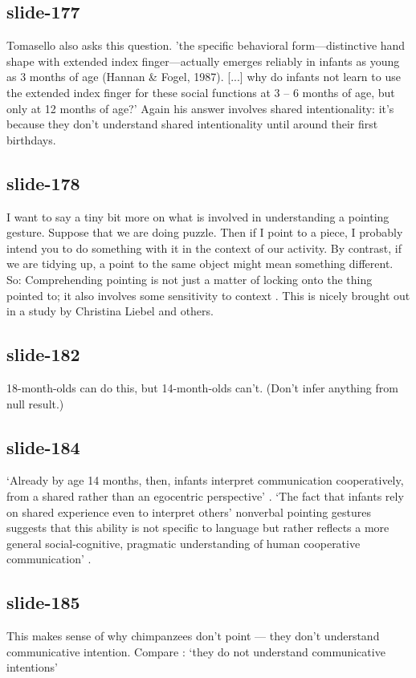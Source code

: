 \documentclass[12pt,\papersize]{extarticle}
\begin{document}
 
\subsection{slide-177}
Tomasello also asks this question.
'the specific behavioral form---distinctive hand shape with extended index finger---actually emerges reliably in infants as young as 3 months of age (Hannan \& Fogel, 1987). [...] why do infants not learn to use the extended index finger for these social functions at 3 – 6 months of age, but only at 12 months of age?' \citep[p.\ 716]{Tomasello:2007fi}
Again his answer involves shared intentionality: it's because they don't understand shared intentionality until around their first birthdays.
 
 
\subsection{slide-178}
I want to say a tiny bit more on what is involved in understanding a pointing gesture.
Suppose that we are doing puzzle. Then if I point to a piece, I probably intend you to do something with it in the context of our activity.
By contrast, if we are tidying up, a point to the same object might mean something different.
So:
Comprehending pointing is not just a matter of locking onto the thing pointed to; it also involves some sensitivity to context \citep[see][]{Liebal:2010lr}.
This is nicely brought out in a study by Christina Liebel and others.
 
 
\subsection{slide-182}
18-month-olds can do this, but 14-month-olds can't. (Don't infer anything from null result.)
 
 
\subsection{slide-184}
‘Already by age 14 months, then, infants interpret communication cooperatively, from a shared rather than an egocentric perspective’ \citep[p.\ 269]{Liebal:2010lr}.
‘The fact that infants rely on shared experience even to interpret others’ nonverbal pointing gestures suggests that this ability is not specific to language but rather reflects a more general social-cognitive, pragmatic understanding of human cooperative communication’ \citep[p.\ 270]{Liebal:2010lr}.
 
 
\subsection{slide-185}
This makes sense of why chimpanzees don't point --- they don't understand communicative intention.
Compare \citep[p.\ 516]{Tomasello:2010dy}: ‘they do not understand communicative intentions’
 
\end{document}
